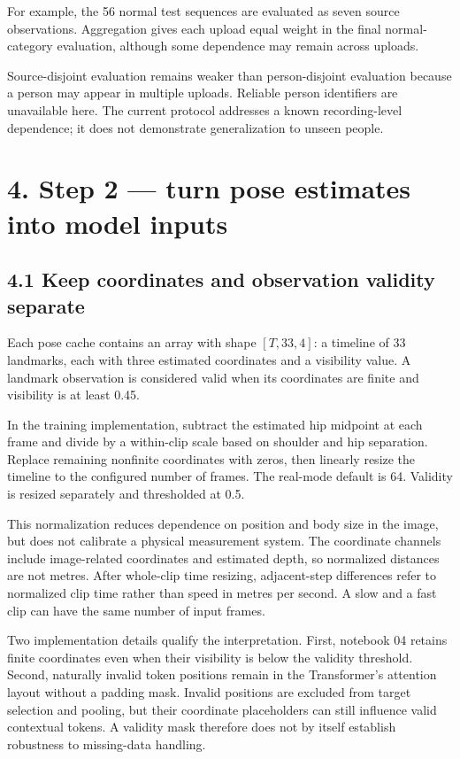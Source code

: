 \documentclass[11pt,letterpaper]{article}
\begin{document}
For example, the 56 normal test sequences are evaluated as seven source
observations. Aggregation gives each upload equal weight in the final
normal-category evaluation, although some dependence may remain across
uploads.

Source-disjoint evaluation remains weaker than person-disjoint
evaluation because a person may appear in multiple uploads. Reliable
person identifiers are unavailable here. The current protocol addresses
a known recording-level dependence; it does not demonstrate
generalization to unseen people.

\section{4. Step 2 --- turn pose estimates into model
inputs}\label{step-2-turn-pose-estimates-into-model-inputs}

\subsection{4.1 Keep coordinates and observation validity
separate}\label{keep-coordinates-and-observation-validity-separate}

Each pose cache contains an array with shape \([T,33,4]\): a timeline of
33 landmarks, each with three estimated coordinates and a visibility
value. A landmark observation is considered valid when its coordinates
are finite and visibility is at least 0.45.

In the training implementation, subtract the estimated hip midpoint at
each frame and divide by a within-clip scale based on shoulder and hip
separation. Replace remaining nonfinite coordinates with zeros, then
linearly resize the timeline to the configured number of frames. The
real-mode default is 64. Validity is resized separately and thresholded
at 0.5.

This normalization reduces dependence on position and body size in the
image, but does not calibrate a physical measurement system. The
coordinate channels include image-related coordinates and estimated
depth, so normalized distances are not metres. After whole-clip time
resizing, adjacent-step differences refer to normalized clip time rather
than speed in metres per second. A slow and a fast clip can have the
same number of input frames.

Two implementation details qualify the interpretation. First, notebook
04 retains finite coordinates even when their visibility is below the
validity threshold. Second, naturally invalid token positions remain in
the Transformer's attention layout without a padding mask. Invalid
positions are excluded from target selection and pooling, but their
coordinate placeholders can still influence valid contextual tokens. A
validity mask therefore does not by itself establish robustness to
missing-data handling.
\end{document}
